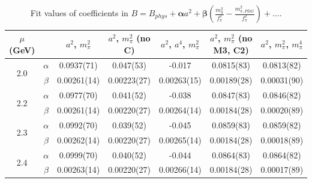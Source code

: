 \documentclass[12pt]{extarticle}
\begin{document}
\begin{table}[h!]
\begin{center}
\begin{tabular}{|c c|c|c|c|c|c|}
\hline
$\mu$ (GeV) &  & $a^2$, $m_\pi^2$& $a^2$, $m_\pi^2$ (no C)& $a^2$, $a^4$, $m_\pi^2$& $a^2$, $m_\pi^2$ (no M3, C2)& $a^2$, $m_\pi^2$, $m_\pi^4$\\
\hline
\multirow{2}{0.5in}{2.0} & $\alpha$ & 0.0937(71)& 0.047(53)& -0.017& 0.0815(83)& 0.0813(82)\\
 & $\beta$ & 0.00261(14)& 0.00223(27)& 0.00263(15)& 0.00189(28)& 0.00031(90)\\
\hline
\multirow{2}{0.5in}{2.2} & $\alpha$ & 0.0977(70)& 0.041(52)& -0.038& 0.0847(83)& 0.0846(82)\\
 & $\beta$ & 0.00261(14)& 0.00220(27)& 0.00264(14)& 0.00184(28)& 0.00020(89)\\
\hline
\multirow{2}{0.5in}{2.3} & $\alpha$ & 0.0992(70)& 0.039(52)& -0.045& 0.0859(83)& 0.0859(82)\\
 & $\beta$ & 0.00262(14)& 0.00220(27)& 0.00265(14)& 0.00184(28)& 0.00018(89)\\
\hline
\multirow{2}{0.5in}{2.4} & $\alpha$ & 0.0999(70)& 0.040(52)& -0.044& 0.0864(83)& 0.0864(82)\\
 & $\beta$ & 0.00263(14)& 0.00220(27)& 0.00266(14)& 0.00184(28)& 0.00017(89)\\
\hline
\end{tabular}
\caption{Fit values of coefficients in $B = B_{phys} + \mathbf{\alpha} a^2 + \mathbf{\beta}\left(\frac{m_\pi^2}{f_\pi^2}-\frac{m_{\pi,PDG}^2}{f_\pi^2}\right) + \ldots$.}
\end{center}
\end{table}




















\clearpage
\end{document}
